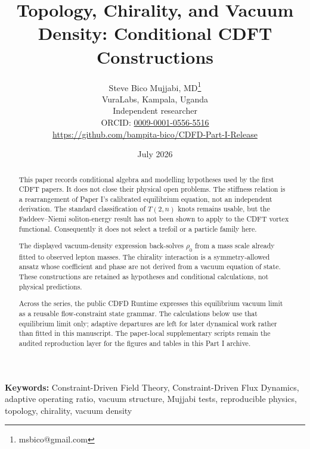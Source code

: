\documentclass[11pt]{article}
\begin{document}
\title{Topology, Chirality, and Vacuum Density: Conditional CDFT Constructions}

\author{Steve Bico Mujjabi, MD\thanks{msbico@gmail.com}\\
VuraLabs, Kampala, Uganda\\
Independent researcher\\
ORCID: \href{https://orcid.org/0009-0001-0556-5516}{0009-0001-0556-5516}\\
\url{https://github.com/bampita-bico/CDFD-Part-I-Release}}

\date{July 2026}

\maketitle

\begin{abstract}
This paper records conditional algebra and modelling hypotheses used by the
first CDFT papers. It does not close their physical open problems. The stiffness
relation is a rearrangement of Paper I's calibrated equilibrium equation, not an
independent derivation. The standard classification of $T(2,n)$ knots remains
usable, but the Faddeev--Niemi soliton-energy result has not been shown to apply
to the CDFT vortex functional. Consequently it does not select a trefoil or a
particle family here.

The displayed vacuum-density expression back-solves $\rho_0$ from a mass scale
already fitted to observed lepton masses. The chirality interaction is a
symmetry-allowed ansatz whose coefficient and phase are not derived from a
vacuum equation of state. These constructions are retained as hypotheses and
conditional calculations, not physical predictions.

Across the series, the public CDFD Runtime expresses this equilibrium vacuum
limit as a reusable flow-constraint state grammar. The calculations below use
that equilibrium limit only; adaptive departures are left for later dynamical
work rather than fitted in this manuscript. The paper-local supplementary
scripts remain the audited reproduction layer for the figures and tables in
this Part I archive.
\end{abstract}

\noindent\textbf{Keywords:} Constraint-Driven Field Theory, Constraint-Driven Flux Dynamics, adaptive operating ratio, vacuum structure, Mujjabi tests, reproducible physics, topology, chirality, vacuum density

\vspace{0.75em}
\linenumbers
\end{document}
